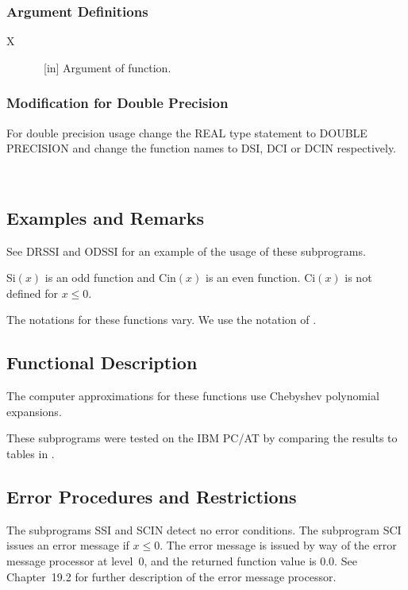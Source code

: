 \documentclass[twoside]{MATH77}
\begin{document}
\subsubsection{Argument Definitions}

\begin{description}
\item[X]  \ [in] Argument of function.
\end{description}

\subsubsection{Modification for Double Precision}

For double precision usage change the REAL type statement to DOUBLE
PRECISION and change the function names to DSI, DCI or DCIN respectively.
\vspace{10pt}

\hspace{5pt}\mbox{ }

\subsection{Examples and Remarks}

See DRSSI and ODSSI for an example of the usage of these subprograms.

Si$(x)$ is an odd function and Cin$(x)$ is an even function. Ci$(x)$ is not
defined for $x \leq 0.$

The notations for these functions vary. We use the notation of
\cite{ams55:sin-int}.

\subsection{Functional Description}

The computer approximations for these functions use Chebyshev polynomial
expansions.

These subprograms were tested on the IBM PC/AT by comparing the results to
tables in \cite{ams55:sin-int}.




\subsection{Error Procedures and Restrictions}

The subprograms SSI and SCIN detect no error conditions. The subprogram SCI
issues an error message if $x \leq 0$. The error message is issued by way of
the error message processor at level~0, and the returned function value is
0.0. See Chapter~19.2 for further description of the error message processor.
\end{document}

